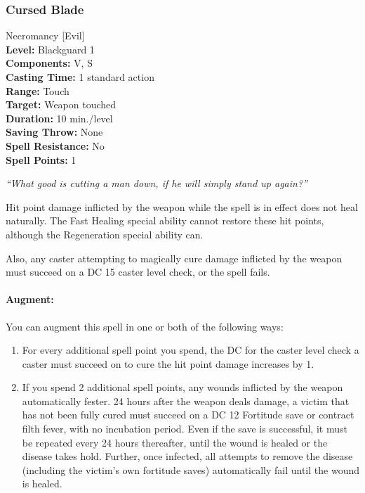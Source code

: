\subsubsection{Cursed Blade}
\label{Spell:CursedBlade}
Necromancy [Evil]
\\ \textbf{Level:} Blackguard 1
\\ \textbf{Components:} V, S
\\ \textbf{Casting Time:} 1 standard action
\\ \textbf{Range:} Touch
\\ \textbf{Target:} Weapon touched
\\ \textbf{Duration:} 10 min./level
\\ \textbf{Saving Throw:} None
\\ \textbf{Spell Resistance:} No
\\ \textbf{Spell Points:} 1

\emph{``What good is cutting a man down, if he will simply stand up again?''}

Hit point damage inflicted by the weapon while the spell is in effect does not heal naturally.
The Fast Healing special ability cannot restore these hit points, although the Regeneration special ability can.

Also, any caster attempting to magically cure damage inflicted by the weapon must succeed on a DC 15 caster level check, or the spell fails.

\paragraph{Augment:} You can augment this spell in one or both of the following ways:
\begin{enumerate}
 \item For every additional spell point you spend, the DC for the caster level check a caster must succeed on to cure the hit point damage increases by 1.
 \item If you spend 2 additional spell points, any wounds inflicted by the weapon automatically fester. 24 hours after the weapon deals damage, a victim that has not been fully cured must succeed on a DC 12 Fortitude save or contract filth fever, with no incubation period. Even if the save is successful, it must be repeated every 24 hours thereafter, until the wound is healed or the disease takes hold. Further, once infected, all attempts to remove the disease (including the victim's own fortitude saves) automatically fail until the wound is healed.
\end{enumerate}


